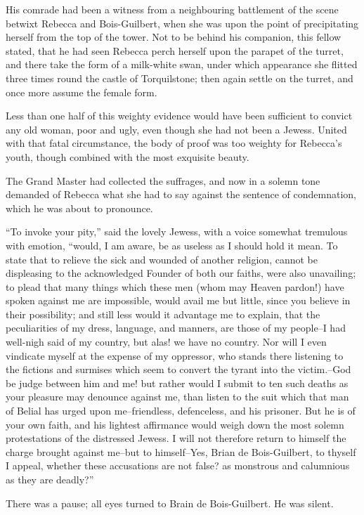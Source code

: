His comrade had been a witness from a neighbouring battlement of the
scene betwixt Rebecca and Bois-Guilbert, when she was upon the point of
precipitating herself from the top of the tower. Not to be behind his
companion, this fellow stated, that he had seen Rebecca perch herself
upon the parapet of the turret, and there take the form of a milk-white
swan, under which appearance she flitted three times round the castle of
Torquilstone; then again settle on the turret, and once more assume the
female form.

Less than one half of this weighty evidence would have been sufficient
to convict any old woman, poor and ugly, even though she had not been a
Jewess. United with that fatal circumstance, the body of proof was too
weighty for Rebecca's youth, though combined with the most exquisite
beauty.

The Grand Master had collected the suffrages, and now in a solemn tone
demanded of Rebecca what she had to say against the sentence of
condemnation, which he was about to pronounce.

``To invoke your pity,'' said the lovely Jewess, with a voice somewhat
tremulous with emotion, ``would, I am aware, be as useless as I should
hold it mean. To state that to relieve the sick and wounded of another
religion, cannot be displeasing to the acknowledged Founder of both our
faiths, were also unavailing; to plead that many things which these men
(whom may Heaven pardon!) have spoken against me are impossible, would
avail me but little, since you believe in their possibility; and still
less would it advantage me to explain, that the peculiarities of my
dress, language, and manners, are those of my people--I had well-nigh
said of my country, but alas! we have no country. Nor will I even
vindicate myself at the expense of my oppressor, who stands there
listening to the fictions and surmises which seem to convert the tyrant
into the victim.--God be judge between him and me! but rather would I
submit to ten such deaths as your pleasure may denounce against me, than
listen to the suit which that man of Belial has urged upon
me--friendless, defenceless, and his prisoner. But he is of your own
faith, and his lightest affirmance would weigh down the most solemn
protestations of the distressed Jewess. I will not therefore return to
himself the charge brought against me--but to himself--Yes, Brian de
Bois-Guilbert, to thyself I appeal, whether these accusations are not
false? as monstrous and calumnious as they are deadly?''

There was a pause; all eyes turned to Brain de Bois-Guilbert. He was
silent.

